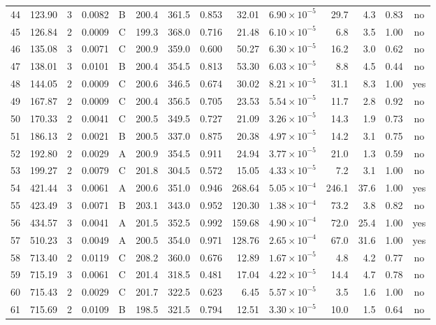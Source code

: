 \begin{landscape}
\begin{longtable}{rrrrlrrrrrrrrc}
44 & 123.90 & 3 & 0.0082 & B & 200.4 & 361.5 & 0.853 & 32.01 & $6.90\times10^{-5}$ & 29.7 & 4.3 & 0.83 & no \\
45 & 126.84 & 2 & 0.0009 & C & 199.3 & 368.0 & 0.716 & 21.48 & $6.10\times10^{-5}$ & 6.8 & 3.5 & 1.00 & no \\
46 & 135.08 & 3 & 0.0071 & C & 200.9 & 359.0 & 0.600 & 50.27 & $6.30\times10^{-5}$ & 16.2 & 3.0 & 0.62 & no \\
47 & 138.01 & 3 & 0.0101 & B & 200.4 & 354.5 & 0.813 & 53.30 & $6.03\times10^{-5}$ & 8.8 & 4.5 & 0.44 & no \\
48 & 144.05 & 2 & 0.0009 & C & 200.6 & 346.5 & 0.674 & 30.02 & $8.21\times10^{-5}$ & 31.1 & 8.3 & 1.00 & yes \\
49 & 167.87 & 2 & 0.0009 & C & 200.4 & 356.5 & 0.705 & 23.53 & $5.54\times10^{-5}$ & 11.7 & 2.8 & 0.92 & no \\
50 & 170.33 & 2 & 0.0041 & C & 200.5 & 349.5 & 0.727 & 21.09 & $3.26\times10^{-5}$ & 14.3 & 1.9 & 0.73 & no \\
51 & 186.13 & 2 & 0.0021 & B & 200.5 & 337.0 & 0.875 & 20.38 & $4.97\times10^{-5}$ & 14.2 & 3.1 & 0.75 & no \\
52 & 192.80 & 2 & 0.0029 & A & 200.9 & 354.5 & 0.911 & 24.94 & $3.77\times10^{-5}$ & 21.0 & 1.3 & 0.59 & no \\
53 & 199.27 & 2 & 0.0079 & C & 201.8 & 304.5 & 0.572 & 15.05 & $4.33\times10^{-5}$ & 7.2 & 3.1 & 1.00 & no \\
54 & 421.44 & 3 & 0.0061 & A & 200.6 & 351.0 & 0.946 & 268.64 & $5.05\times10^{-4}$ & 246.1 & 37.6 & 1.00 & yes \\
55 & 423.49 & 3 & 0.0071 & B & 203.1 & 343.0 & 0.952 & 120.30 & $1.38\times10^{-4}$ & 73.2 & 3.8 & 0.82 & no \\
56 & 434.57 & 3 & 0.0041 & A & 201.5 & 352.5 & 0.992 & 159.68 & $4.90\times10^{-4}$ & 72.0 & 25.4 & 1.00 & yes \\
57 & 510.23 & 3 & 0.0049 & A & 200.5 & 354.0 & 0.971 & 128.76 & $2.65\times10^{-4}$ & 67.0 & 31.6 & 1.00 & yes \\
58 & 713.40 & 2 & 0.0119 & C & 208.2 & 360.0 & 0.676 & 12.89 & $1.67\times10^{-5}$ & 4.8 & 4.2 & 0.77 & no \\
59 & 715.19 & 3 & 0.0061 & C & 201.4 & 318.5 & 0.481 & 17.04 & $4.22\times10^{-5}$ & 14.4 & 4.7 & 0.78 & no \\
60 & 715.43 & 2 & 0.0029 & C & 201.7 & 322.5 & 0.623 & 6.45 & $5.57\times10^{-5}$ & 3.5 & 1.6 & 1.00 & no \\
61 & 715.69 & 2 & 0.0109 & B & 198.5 & 321.5 & 0.794 & 12.51 & $3.30\times10^{-5}$ & 10.0 & 1.5 & 0.64 & no \\

\end{longtable}
\end{landscape}
